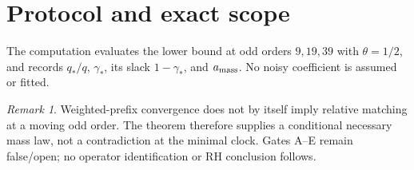 \documentclass[11pt]{article}
\theoremstyle{remark}\newtheorem{remark}[theorem]{Remark}
\begin{document}
\section{Protocol and exact scope}
The computation evaluates the lower bound at odd orders $9,19,39$ with
$\theta=1/2$, and records $q_*/q$, $\gamma_*$, its slack $1-\gamma_*$, and
$a_{\rm mass}$.  No noisy coefficient is assumed or fitted.

\begin{remark}
Weighted-prefix convergence does not by itself imply relative matching at a
moving odd order.  The theorem therefore supplies a conditional necessary
mass law, not a contradiction at the minimal clock.  Gates A--E remain
false/open; no operator identification or RH conclusion follows.
\end{remark}
\end{document}
